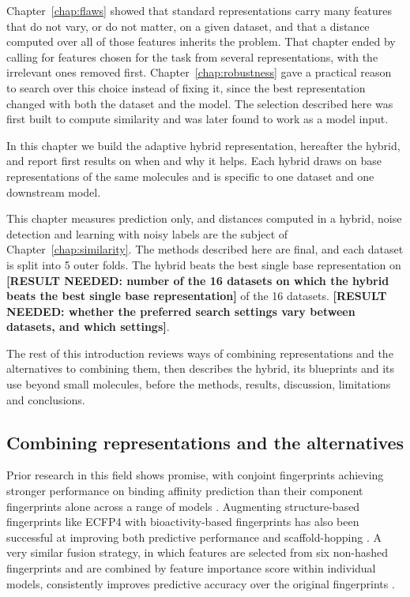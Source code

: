 Chapter~\ref{chap:flaws} showed that standard representations carry many features that do not vary, or do not matter, on a given dataset, and that a distance computed over all of those features inherits the problem. That chapter ended by calling for features chosen for the task from several representations, with the irrelevant ones removed first. Chapter~\ref{chap:robustness} gave a practical reason to search over this choice instead of fixing it, since the best representation changed with both the dataset and the model. The selection described here was first built to compute similarity and was later found to work as a model input.

In this chapter we build the adaptive hybrid representation, hereafter the hybrid, and report first results on when and why it helps. Each hybrid draws on base representations of the same molecules and is specific to one dataset and one downstream model.

This chapter measures prediction only, and distances computed in a hybrid, noise detection and learning with noisy labels are the subject of Chapter~\ref{chap:similarity}. The methods described here are final, and each dataset is split into 5 outer folds. The hybrid beats the best single base representation on \textbf{[RESULT NEEDED: number of the 16 datasets on which the hybrid beats the best single base representation]} of the 16 datasets. \textbf{[RESULT NEEDED: whether the preferred search settings vary between datasets, and which settings]}.

The rest of this introduction reviews ways of combining representations and the alternatives to combining them, then describes the hybrid, its blueprints and its use beyond small molecules, before the methods, results, discussion, limitations and conclusions.


\subsection{Combining representations and the alternatives}

Prior research in this field shows promise, with conjoint fingerprints achieving stronger performance on binding affinity prediction than their component fingerprints alone across a range of models \citep{Xie2020}. Augmenting structure-based fingerprints like ECFP4 with bioactivity-based fingerprints has also been successful at improving both predictive performance and scaffold-hopping \citep{Laufktter2019}. A very similar fusion strategy, in which features are selected from six non-hashed fingerprints and are combined by feature importance score within individual models, consistently improves predictive accuracy over the original fingerprints \citep{Turkina2025}. 

